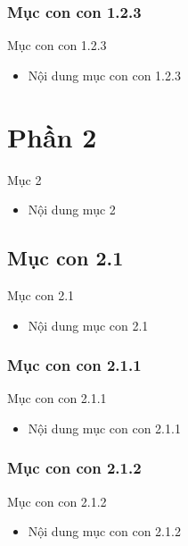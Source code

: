 \documentclass{beamer}
\begin{document}
\subsubsection{Mục con con 1.2.3}
\begin{frame}{Mục con con 1.2.3}
    \begin{itemize}
        \item Nội dung mục con con 1.2.3
    \end{itemize}
\end{frame}

\section{Phần 2}
\begin{frame}{Mục 2}
    \begin{itemize}
        \item Nội dung mục 2
    \end{itemize}
\end{frame}

\subsection{Mục con 2.1}
\begin{frame}{Mục con 2.1}
    \begin{itemize}
        \item Nội dung mục con 2.1
    \end{itemize}
\end{frame}

\subsubsection{Mục con con 2.1.1}
\begin{frame}{Mục con con 2.1.1}
    \begin{itemize}
        \item Nội dung mục con con 2.1.1
    \end{itemize}
\end{frame}

\subsubsection{Mục con con 2.1.2}
\begin{frame}{Mục con con 2.1.2}
    \begin{itemize}
        \item Nội dung mục con con 2.1.2
    \end{itemize}
\end{frame}
\end{document}
